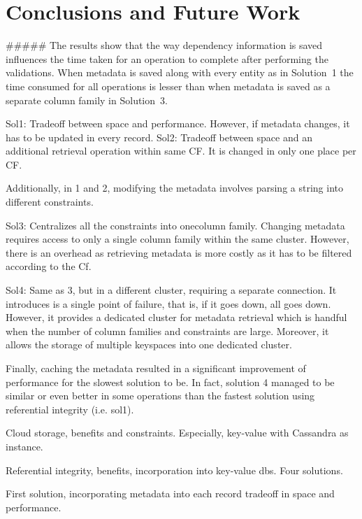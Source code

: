 \chapter{Conclusions and Future Work}
##### The results show that the way dependency information is saved influences
the time taken for an operation to complete after performing the validations.
When metadata is saved along with every entity as in Solution~1 the time
consumed for all operations is lesser than when metadata is saved as a separate
column family in Solution~3.  

Sol1: Tradeoff between space and performance.
However, if metadata changes, it has to be updated in every record.
Sol2: Tradeoff between space and an additional retrieval operation within same
CF. It is changed in only one place per CF.
	
Additionally, in 1 and 2, modifying the metadata involves parsing a string into
different constraints.
	
Sol3: Centralizes all the constraints into onecolumn family. Changing metadata
requires access to only a single column family within the same cluster.
However, there is an overhead as retrieving metadata is more costly as it has to
be filtered according to the Cf.
	
Sol4: Same as 3, but in a different cluster, requiring a separate connection.
It introduces is a single point of failure, that is, if it goes down, all goes
down. However, it provides a dedicated cluster for metadata retrieval which is
handful when the number of column families and constraints are large.
Moreover, it allows the storage of multiple keyspaces into one dedicated
cluster.
	
Finally, caching the metadata resulted in a significant improvement of
performance for the slowest solution to be. In fact, solution 4 managed to be
similar or even better in some operations than the fastest solution using
referential integrity (i.e. sol1).
	
	
Cloud storage, benefits and constraints. Especially, key-value with Cassandra as
instance.
	
Referential integrity, benefits, incorporation into key-value dbs. Four
solutions.
	
First solution, incorporating metadata into each record tradeoff in space and
performance.
	

